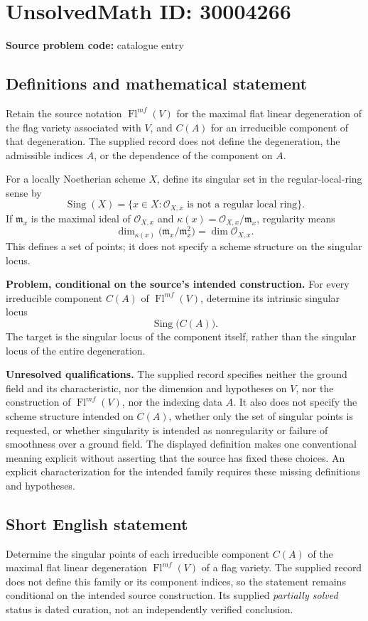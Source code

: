 \documentclass[11pt]{article}
\begin{document}
\section*{UnsolvedMath ID: 30004266}
\textbf{Source problem code:} catalogue entry
\subsection{Definitions and mathematical statement}
Retain the source notation \(\operatorname{Fl}^{mf}(V)\) for the maximal flat linear degeneration of the flag variety associated with \(V\), and \(C(A)\) for an irreducible component of that degeneration. The supplied record does not define the degeneration, the admissible indices \(A\), or the dependence of the component on \(A\).

For a locally Noetherian scheme \(X\), define its singular set in the regular-local-ring sense by
\[
\operatorname{Sing}(X)=\{x\in X:\mathcal O_{X,x}\text{ is not a regular local ring}\}.
\]
If \(\mathfrak m_x\) is the maximal ideal of \(\mathcal O_{X,x}\) and \(\kappa(x)=\mathcal O_{X,x}/\mathfrak m_x\), regularity means
\[
\dim_{\kappa(x)}\bigl(\mathfrak m_x/\mathfrak m_x^2\bigr)=\dim\mathcal O_{X,x}.
\]
This defines a set of points; it does not specify a scheme structure on the singular locus.

\textbf{Problem, conditional on the source's intended construction.} For every irreducible component \(C(A)\) of \(\operatorname{Fl}^{mf}(V)\), determine its intrinsic singular locus
\[
\operatorname{Sing}\bigl(C(A)\bigr).
\]
The target is the singular locus of the component itself, rather than the singular locus of the entire degeneration.

\textbf{Unresolved qualifications.} The supplied record specifies neither the ground field and its characteristic, nor the dimension and hypotheses on \(V\), nor the construction of \(\operatorname{Fl}^{mf}(V)\), nor the indexing data \(A\). It also does not specify the scheme structure intended on \(C(A)\), whether only the set of singular points is requested, or whether singularity is intended as nonregularity or failure of smoothness over a ground field. The displayed definition makes one conventional meaning explicit without asserting that the source has fixed these choices. An explicit characterization for the intended family requires these missing definitions and hypotheses.
\subsection{Short English statement}
Determine the singular points of each irreducible component \(C(A)\) of the maximal flat linear degeneration \(\operatorname{Fl}^{mf}(V)\) of a flag variety. The supplied record does not define this family or its component indices, so the statement remains conditional on the intended source construction. Its supplied \emph{partially solved} status is dated curation, not an independently verified conclusion.
\end{document}
